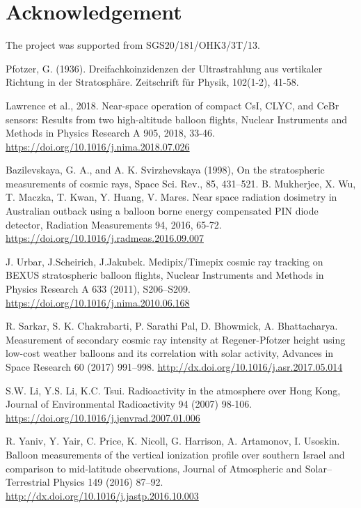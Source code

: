 \documentclass{Rpd}
\begin{document}
\section*{Acknowledgement}
The project was supported from  SGS20/181/OHK3/3T/13.

\begin{thebibliography}{99.}%

 Pfotzer, G. (1936). Dreifachkoinzidenzen der Ultrastrahlung aus vertikaler Richtung in der Stratosphäre. Zeitschrift für Physik, 102(1-2), 41-58.

 Lawrence et al., 2018. Near-space operation of compact CsI, CLYC, and CeBr sensors: Results from two high-altitude balloon flights, Nuclear Instruments and Methods in Physics Research A 905, 2018, 33-46. \url{https://doi.org/10.1016/j.nima.2018.07.026}

 Bazilevskaya, G. A., and A. K. Svirzhevskaya (1998), On the stratospheric measurements of cosmic rays, Space Sci. Rev., 85, 431–521.
 B. Mukherjee, X. Wu, T. Maczka, T. Kwan, Y. Huang, V. Mares. Near space radiation dosimetry in Australian outback using a balloon borne energy compensated PIN diode detector, Radiation Measurements 94, 2016, 65-72. \url{https://doi.org/10.1016/j.radmeas.2016.09.007}

 J. Urbar, J.Scheirich, J.Jakubek. Medipix/Timepix cosmic ray tracking on BEXUS stratospheric balloon flights, Nuclear Instruments and Methods in Physics Research A 633 (2011), S206–S209. \url{https://doi.org/10.1016/j.nima.2010.06.168}

 R. Sarkar, S. K. Chakrabarti, P. Sarathi Pal, D. Bhowmick, A. Bhattacharya. Measurement of secondary cosmic ray intensity at Regener-Pfotzer height using low-cost weather balloons and its correlation with solar activity, Advances in Space Research 60 (2017) 991–998. \url{http://dx.doi.org/10.1016/j.asr.2017.05.014}

 S.W. Li, Y.S. Li, K.C. Tsui. Radioactivity in the atmosphere over Hong Kong, Journal of Environmental Radioactivity 94 (2007) 98-106. \url{https://doi.org/10.1016/j.jenvrad.2007.01.006}

 R. Yaniv, Y. Yair, C. Price, K. Nicoll, G. Harrison, A. Artamonov, I. Usoskin. Balloon measurements of the vertical ionization profile over southern Israel and comparison to mid-latitude observations, Journal of Atmospheric and Solar–Terrestrial Physics 149 (2016) 87–92. \url{http://dx.doi.org/10.1016/j.jastp.2016.10.003}


\end{thebibliography}
\end{document}
